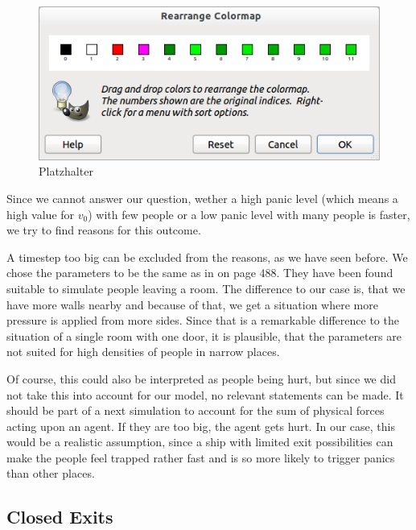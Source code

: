 \documentclass[11pt]{article}
\begin{document}
\begin{figure}[h]
	\centering
	\includegraphics[scale=0.5]{images/gimp.png}
	\caption{Platzhalter}
	\label{stuckinwall}
	
\end{figure}

Since we cannot answer our question, wether a high panic level (which means a high value for \(v_0\))
with few people
or a low panic level with many people is faster, we try to find reasons for this outcome.

A timestep too big can be excluded from the reasons, as we have seen before.
We chose the parameters to be the same as in \cite{helbing} on page 488.
They have been found suitable to simulate people leaving a room.
The difference to our case is, that we have more walls nearby and
because of that, we get a situation where more pressure is applied from more sides. 
Since that is a remarkable difference to the situation of a single room with one door, 
it is plausible, that the parameters are not suited for high densities of people in 
narrow places. 

Of course, this could also be interpreted as people being hurt, but since
we did not take this into account for our model, no relevant statements can
be made. It should be part of a next simulation to account for the sum of 
physical forces acting upon an agent. If they are too big, the agent gets hurt.
In our case, this would be a realistic assumption, since a ship with limited
exit possibilities can make the people feel trapped rather fast and is so more
likely to trigger panics than other places.



\subsection{Closed Exits} %
\label{sub:Closed exits}
\end{document}
